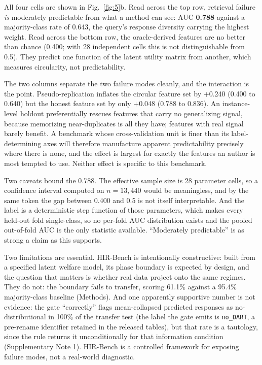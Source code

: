 \documentclass[11pt,letterpaper]{article}
\begin{document}
All four cells are shown in Fig.~\ref{fig:5}b. Read across the top row, retrieval failure
\emph{is} moderately predictable from what a method can see: AUC \textbf{0.788} against a
majority-class rate of 0.643, the query's response diversity carrying the highest weight. Read
across the bottom row, the oracle-derived features are no better than chance (0.400;
with 28 independent cells this is not distinguishable from 0.5). They predict one function of the
latent utility matrix from another, which measures circularity, not predictability.

The two columns separate the two failure modes cleanly, and the interaction is the point.
Pseudo-replication inflates the circular feature set by $+$0.240 (0.400 to 0.640)
but the honest feature set by only $+$0.048 (0.788 to 0.836). An instance-level
holdout preferentially rescues features that carry no generalizing signal, because
memorizing near-duplicates is all they have; features with real signal barely benefit.
A benchmark whose cross-validation unit is finer than its label-determining axes will
therefore manufacture apparent predictability precisely where there is none, and the effect
is largest for exactly the features an author is most tempted to use. Neither effect is
specific to this benchmark.

Two caveats bound the 0.788. The
effective sample size is 28 parameter cells, so a confidence interval computed on
$n = 13{,}440$ would be meaningless, and by the same token the gap between 0.400 and 0.5 is
not itself interpretable. And the label is a deterministic step function of those
parameters, which makes every held-out fold single-class, so no per-fold AUC distribution
exists and the pooled out-of-fold AUC is the only statistic available. ``Moderately
predictable'' is as strong a claim as this supports.

Two limitations are essential. HIR-Bench is intentionally constructive: built from a specified
latent welfare model, its phase boundary is expected by design, and the question that
matters is whether real data project onto the same regimes. They do not: the boundary fails to
transfer, scoring 61.1\% against a 95.4\% majority-class baseline (Methods). And one apparently
supportive number is not evidence: the gate ``correctly'' flags mean-collapsed predicted responses
as no-distributional in 100\% of the transfer test (the label the gate emits is \texttt{no\_DART},
a pre-rename identifier retained in the released tables), but that rate is a tautology, since the
rule returns it unconditionally for that information condition (Supplementary Note 1). HIR-Bench is
a controlled framework for exposing failure modes, not a real-world diagnostic.
\end{document}
